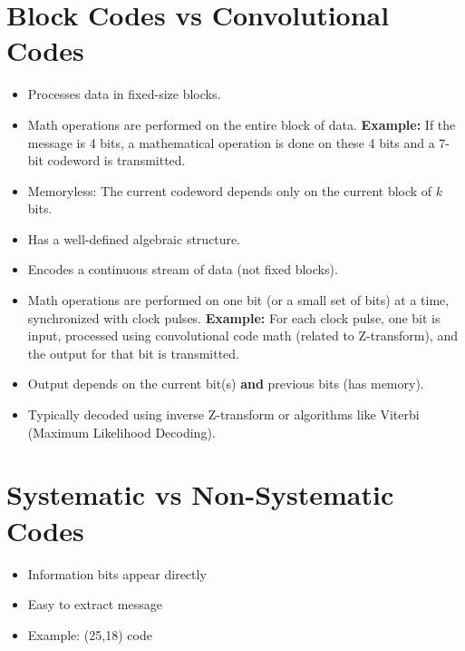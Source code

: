 \documentclass[11pt,a4paper]{book}
\newenvironment{definitionbox}[1][Definition]{
    \begin{tcolorbox}[
        enhanced,
        breakable,
        colback=primaryblue!10,
        colframe=primaryblue!150,
        title=#1,
        fonttitle=\bfseries,
        sharp corners,
        boxrule=0.8pt,
        left=8pt,
        right=8pt,
        top=6pt,
        bottom=6pt
    ]
}{
    \end{tcolorbox}
}
\begin{document}
\section{Block Codes vs Convolutional Codes}

\begin{definitionbox}[Block Code]
    \begin{itemize}
        \item Processes data in fixed-size blocks.
        \item Math operations are performed on the entire block of data.  \textbf{Example:} If the message is 4 bits, a mathematical operation is done on these 4 bits and a 7-bit codeword is transmitted.
        \item Memoryless: The current codeword depends only on the current block of $k$ bits.
        \item Has a well-defined algebraic structure.
    \end{itemize}
\end{definitionbox}

\begin{definitionbox}[Convolutional Code]
    \begin{itemize}
        \item Encodes a continuous stream of data (not fixed blocks).
        \item Math operations are performed on one bit (or a small set of bits) at a time, synchronized with clock pulses. \textbf{Example:} For each clock pulse, one bit is input, processed using convolutional code math (related to Z-transform), and the output for that bit is transmitted.
        \item Output depends on the current bit(s) \textbf{and} previous bits (has memory).
        \item Typically decoded using inverse Z-transform or algorithms like Viterbi (Maximum Likelihood Decoding).
    \end{itemize}
\end{definitionbox}

\section{Systematic vs Non-Systematic Codes}

\begin{definitionbox}[Systematic Code]
\begin{itemize}
    \item Information bits appear directly
    \item Easy to extract message 
    \item Example: (25,18) code 
\end{itemize}
    
\end{definitionbox}
\end{document}

